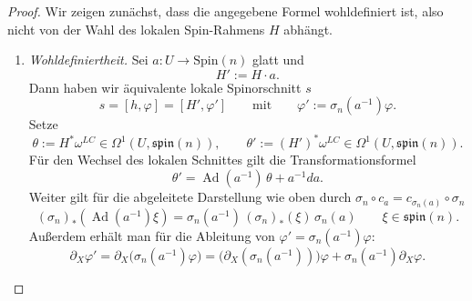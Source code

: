 \documentclass[10pt, letterpaper]{article}
\newcommand{\Ad}{\operatorname{Ad}}
\newcommand{\Spin}{\mathrm{Spin}}
\begin{document}
\begin{proof}
Wir zeigen zunächst, dass die angegebene Formel wohldefiniert ist, also nicht von der Wahl des lokalen Spin-Rahmens \(H\) abhängt.

\medskip

\begin{enumerate}
    \item \emph{Wohldefiniertheit.}
    Sei \(a:U\to \Spin(n)\) glatt und
    \[
    H':=H\cdot a.
    \]
    Dann haben wir äquivalente lokale Spinorschnitt \(s\)
    \[
    s= [h,\varphi]= [H',\varphi']
    \qquad\text{mit}\qquad
    \varphi':=\sigma_n(a^{-1})\varphi.
    \]
    Setze
    \[
    \theta:=H^*\omega^{LC}\in \Omega^1(U,\mathfrak{spin}(n)),
    \qquad
    \theta':=(H')^*\omega^{LC}\in \Omega^1(U,\mathfrak{spin}(n)).
    \]
    Für den Wechsel des lokalen Schnittes gilt die Transformationsformel \parencite[38]{Kraus2025}
    \[
    \theta'=\Ad(a^{-1})\,\theta+a^{-1}da.
    \]
    Weiter gilt für die abgeleitete Darstellung wie oben durch $\sigma_n\circ c_a=c_{\sigma_n(a)}\circ\sigma_n$
    \[
    (\sigma_n)_*(\Ad(a^{-1})\xi)
    =
    \sigma_n(a^{-1})\,(\sigma_n)_*(\xi)\,\sigma_n(a)
    \qquad
    \xi\in \mathfrak{spin}(n).
    \]
    Außerdem erhält man für die Ableitung von \(\varphi'=\sigma_n(a^{-1})\varphi\):
    \[
    \partial_X\varphi'
    =
    \partial_X\bigl(\sigma_n(a^{-1})\varphi\bigr)
    =
    \bigl(\partial_X(\sigma_n(a^{-1}))\bigr)\varphi+\sigma_n(a^{-1})\partial_X\varphi.
    \]


\end{enumerate}
\end{proof}
\end{document}
